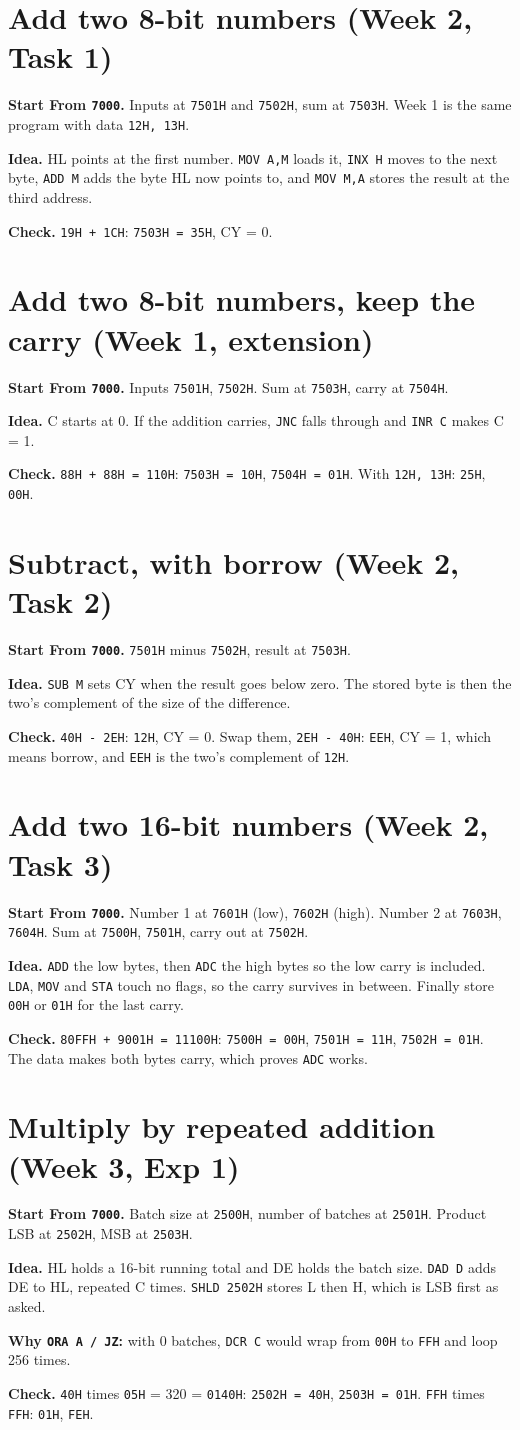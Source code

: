\documentclass[11pt,a4paper]{article}
\newcommand{\code}[1]{\texttt{#1}}
\newcommand{\prog}[2]{\needspace{12\baselineskip}\section{#1}\label{#2}}
\newcommand{\meta}[2]{\textbf{Start From \code{#1}.} #2\par}
\newcommand{\twocol}[3]{%
\begin{minipage}[t]{#1\textwidth}\vspace{0pt}\end{minipage}\hfill
\begin{minipage}[t]{\dimexpr0.97\textwidth-#1\textwidth\relax}\vspace{0pt}#3\end{minipage}\par}
\begin{document}
\prog{Add two 8-bit numbers (Week 2, Task 1)}{p1}
\meta{7000}{Inputs at \code{7501H} and \code{7502H}, sum at \code{7503H}. Week 1 is the same program with data \code{12H, 13H}.}
\twocol{0.34}{w2_t1_add.asm}{%
\textbf{Idea.} HL points at the first number. \code{MOV A,M} loads it, \code{INX H} moves to the next byte, \code{ADD M} adds the byte HL now points to, and \code{MOV M,A} stores the result at the third address.

\textbf{Check.} \code{19H + 1CH}: \code{7503H = 35H}, CY = 0.}

\prog{Add two 8-bit numbers, keep the carry (Week 1, extension)}{p2}
\meta{7000}{Inputs \code{7501H}, \code{7502H}. Sum at \code{7503H}, carry at \code{7504H}.}
\twocol{0.34}{w1_add_carry.asm}{%
\textbf{Idea.} C starts at 0. If the addition carries, \code{JNC} falls through and \code{INR C} makes C = 1.

\textbf{Check.} \code{88H + 88H = 110H}: \code{7503H = 10H}, \code{7504H = 01H}. With \code{12H, 13H}: \code{25H}, \code{00H}.}

\prog{Subtract, with borrow (Week 2, Task 2)}{p3}
\meta{7000}{\code{7501H} minus \code{7502H}, result at \code{7503H}.}
\twocol{0.34}{w2_t2_sub.asm}{%
\textbf{Idea.} \code{SUB M} sets CY when the result goes below zero. The stored byte is then the two's complement of the size of the difference.

\textbf{Check.} \code{40H - 2EH}: \code{12H}, CY = 0. Swap them, \code{2EH - 40H}: \code{EEH}, CY = 1, which means borrow, and \code{EEH} is the two's complement of \code{12H}.}

\prog{Add two 16-bit numbers (Week 2, Task 3)}{p4}
\meta{7000}{Number 1 at \code{7601H} (low), \code{7602H} (high). Number 2 at \code{7603H}, \code{7604H}. Sum at \code{7500H}, \code{7501H}, carry out at \code{7502H}.}
\twocol{0.34}{w2_t3_add16.asm}{%
\textbf{Idea.} \code{ADD} the low bytes, then \code{ADC} the high bytes so the low carry is included. \code{LDA}, \code{MOV} and \code{STA} touch no flags, so the carry survives in between. Finally store \code{00H} or \code{01H} for the last carry.

\textbf{Check.} \code{80FFH + 9001H = 11100H}: \code{7500H = 00H}, \code{7501H = 11H}, \code{7502H = 01H}. The data makes both bytes carry, which proves \code{ADC} works.}

\prog{Multiply by repeated addition (Week 3, Exp 1)}{p5}
\meta{7000}{Batch size at \code{2500H}, number of batches at \code{2501H}. Product LSB at \code{2502H}, MSB at \code{2503H}.}
\twocol{0.34}{w3_e1_mult.asm}{%
\textbf{Idea.} HL holds a 16-bit running total and DE holds the batch size. \code{DAD D} adds DE to HL, repeated C times. \code{SHLD 2502H} stores L then H, which is LSB first as asked.

\textbf{Why \code{ORA A / JZ}:} with 0 batches, \code{DCR C} would wrap from \code{00H} to \code{FFH} and loop 256 times.

\textbf{Check.} \code{40H} times \code{05H} = 320 = \code{0140H}: \code{2502H = 40H}, \code{2503H = 01H}. \code{FFH} times \code{FFH}: \code{01H}, \code{FEH}.}
\end{document}
